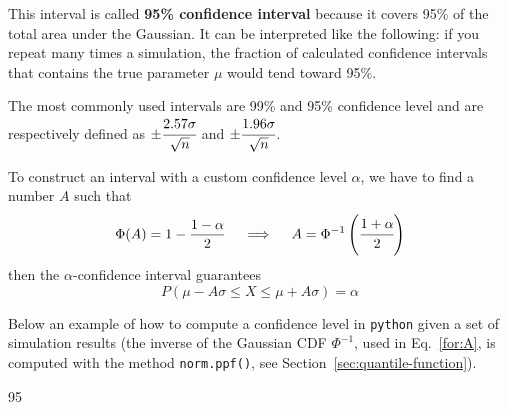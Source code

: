 This interval is called \textbf{95\% confidence interval} because it covers 95\% of the total area under the Gaussian. It can be interpreted like the following: if you repeat many times a simulation, the fraction of calculated confidence intervals that contains the true parameter $\mu$ would tend toward 95\%.

The most commonly used intervals are 99\% and 95\% confidence level and are respectively defined as \(\pm \cfrac{2.57\sigma}{\sqrt{n}}\) and \(\pm \cfrac{1.96\sigma}{\sqrt{n}}\).

To construct an interval with a custom confidence level $\alpha$, we have to find a number $A$ such that
\begin{equation}
\Phi(A) = 1 - \frac{1-\alpha}{2}\quad\implies\quad A = \Phi^{-1}\left(\cfrac{1+\alpha}{2}\right)
\label{for:A}
\end{equation}
then the $\alpha$-confidence interval guarantees
\begin{equation}
P(\mu - A\sigma \le X \le \mu+ A\sigma) = \alpha 
\end{equation}

Below an example of how to compute a confidence level in \texttt{python} given a set of simulation results (the inverse of the Gaussian CDF $\Phi^{-1}$, used in Eq.~\ref{for:A}, is computed with the method \texttt{norm.ppf()}, see Section~\ref{sec:quantile-function}).

\begin{ioutput}
95%
\end{ioutput}

